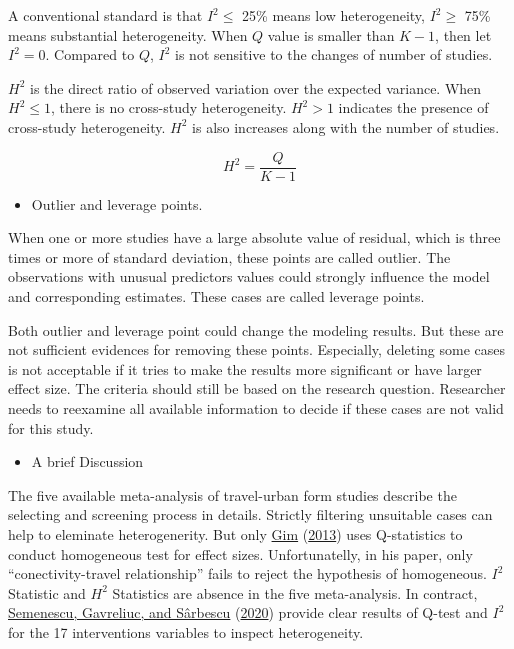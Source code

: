 \documentclass[
  11pt,
  openany]{memoir}
\providecommand{\tightlist}{%
  \setlength{\itemsep}{0pt}\setlength{\parskip}{0pt}}
\begin{document}
A conventional standard is that \(I^2\le\) 25\% means low heterogeneity, \(I^2\ge\) 75\% means substantial heterogeneity.
When \(Q\) value is smaller than \(K-1\), then let \(I^2=0\).
Compared to \(Q\), \(I^2\) is not sensitive to the changes of number of studies.

\(H^2\) is the direct ratio of observed variation over the expected variance.
When \(H^2\le1\), there is no cross-study heterogeneity.
\(H^2>1\) indicates the presence of cross-study heterogeneity.
\(H^2\) is also increases along with the number of studies.

\begin{equation}
H^2 = \frac{Q}{K-1}
\end{equation}

\begin{itemize}
\tightlist
\item
  Outlier and leverage points.
\end{itemize}

When one or more studies have a large absolute value of residual, which is three times or more of standard deviation, these points are called outlier.
The observations with unusual predictors values could strongly influence the model and corresponding estimates.
These cases are called leverage points.

Both outlier and leverage point could change the modeling results.
But these are not sufficient evidences for removing these points.
Especially, deleting some cases is not acceptable if it tries to make the results more significant or have larger effect size.
The criteria should still be based on the research question.
Researcher needs to reexamine all available information to decide if these cases are not valid for this study.

\begin{itemize}
\tightlist
\item
  A brief Discussion
\end{itemize}

The five available meta-analysis of travel-urban form studies describe the selecting and screening process in details.
Strictly filtering unsuitable cases can help to eleminate heterogenerity.
But only \protect\hyperlink{ref-gimRelationshipsLandUse2013}{Gim} (\protect\hyperlink{ref-gimRelationshipsLandUse2013}{2013}) uses Q-statistics to conduct homogeneous test for effect sizes.
Unfortunatelly, in his paper, only ``conectivity-travel relationship'' fails to reject the hypothesis of homogeneous.
\(I^2\) Statistic and \(H^2\) Statistics are absence in the five meta-analysis. In contract, \protect\hyperlink{ref-semenescu30YearsSoft2020}{Semenescu, Gavreliuc, and Sârbescu} (\protect\hyperlink{ref-semenescu30YearsSoft2020}{2020}) provide clear results of Q-test and \(I^2\) for the 17 interventions variables to inspect heterogeneity.
\end{document}
